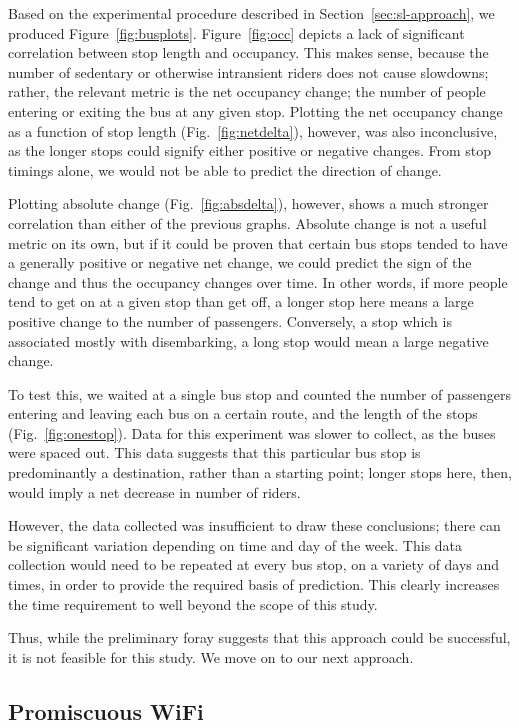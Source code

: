 Based on the experimental procedure described in Section~\ref{sec:sl-approach}, we produced Figure~\ref{fig:busplots}.
Figure~\ref{fig:occ} depicts a lack of significant correlation between stop length and occupancy.
This makes sense, because the number of sedentary or otherwise intransient riders does not cause slowdowns; rather, the relevant metric is the net occupancy change; the number of people entering or exiting the bus at any given stop.
Plotting the net occupancy change as a function of stop length (Fig.~\ref{fig:netdelta}), however, was also inconclusive, as the longer stops could signify either positive or negative changes.
From stop timings alone, we would not be able to predict the direction of change.

Plotting absolute change (Fig.~\ref{fig:absdelta}), however, shows a much stronger correlation than either of the previous graphs.
Absolute change is not a useful metric on its own, but if it could be proven that certain bus stops tended to have a generally positive or negative net change, we could predict the sign of the change and thus the occupancy changes over time.
In other words, if more people tend to get on at a given stop than get off, a longer stop here means a large positive change to the number of passengers.
Conversely, a stop which is associated mostly with disembarking, a long stop would mean a large negative change.

To test this, we waited at a single bus stop and counted the number of passengers entering and leaving each bus on a certain route, and the length of the stops (Fig.~\ref{fig:onestop}).
Data for this experiment was slower to collect, as the buses were spaced out.
This data suggests that this particular bus stop is predominantly a destination, rather than a starting point; longer stops here, then, would imply a net decrease in number of riders.

However, the data collected was insufficient to draw these conclusions; there can be significant variation depending on time and day of the week.
This data collection would need to be repeated at every bus stop, on a variety of days and times, in order to provide the required basis of prediction.
This clearly increases the time requirement to well beyond the scope of this study.

Thus, while the preliminary foray suggests that this approach could be successful, it is not feasible for this study.
We move on to our next approach.

\subsection{Promiscuous WiFi}

